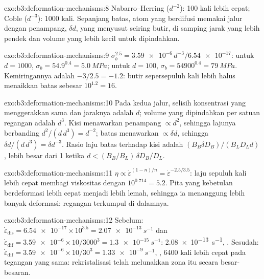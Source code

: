 \begin{solution}{exo:b3:deformation-mechanisms:8}
Nabarro--Herring ($d^{-2}$): 100 kali lebih cepat; Coble ($d^{-3}$): 1000 kali.
Sepanjang batas, atom yang berdifusi memakai jalur dengan penampang, $\delta
d$, yang menyusut seiring butir, di samping jarak yang lebih pendek dan volume
yang lebih kecil untuk dipindahkan.
\end{solution}

\begin{solution}{exo:b3:deformation-mechanisms:9}
$\sigma_b^{2.5} = \num{3.59e-6}\,d^{-3}/\num{6.54e-17}$: untuk $d = 1000$,
$\sigma_b = 54.9^{0.4} = \qty{5.0}{MPa}$; untuk $d = 100$, $\sigma_b =
\num{54900}^{0.4} = \qty{79}{MPa}$. Kemiringannya adalah $-3/2.5 = -1.2$: butir
sepersepuluh kali lebih halus menaikkan batas sebesar $10^{1.2} = 16$.
\end{solution}

\begin{solution}{exo:b3:deformation-mechanisms:10}
Pada kedua jalur, selisih konsentrasi yang menggerakkan sama dan jaraknya
adalah $d$; volume yang dipindahkan per satuan regangan adalah $d^3$. Kisi
menawarkan penampang $\propto d^2$, sehingga lajunya berbanding $d^2/(d\,d^3) =
d^{-2}$; batas menawarkan $\propto\delta d$, sehingga $\delta d/(d\,d^3) = \delta
d^{-3}$. Rasio laju batas terhadap kisi adalah $(B_B\delta D_B)/(B_LD_Ld)$,
lebih besar dari 1 ketika $d < (B_B/B_L)\,\delta D_B/D_L$.
\end{solution}

\begin{solution}{exo:b3:deformation-mechanisms:11}
$\eta \propto \dot\varepsilon^{(1-n)/n} = \dot\varepsilon^{-2.5/3.5}$: laju
sepuluh kali lebih cepat membagi viskositas dengan $10^{0.714} = 5.2$. Pita
yang kebetulan berdeformasi lebih cepat menjadi lebih lemah, sehingga ia
menanggung lebih banyak deformasi: regangan terkumpul di dalamnya.
\end{solution}

\begin{solution}{exo:b3:deformation-mechanisms:12}
Sebelum: $\dot\varepsilon_{\mathrm{dis}} = \num{6.54e-17}\times10^{3.5} =
\qty{2.07e-13}{s^{-1}}$ dan $\dot\varepsilon_{\mathrm{dif}} = \num{3.59e-6}
\times10/3000^3 = \qty{1.3e-15}{s^{-1}}$: \qty{2.08e-13}{s^{-1}}, . Sesudah: $\dot\varepsilon_{\mathrm{dif}} = \num{3.59e-6}\times10/30^3 =
\qty{1.33e-9}{s^{-1}}$, , \num{6400} kali lebih cepat pada
tegangan yang sama: rekristalisasi telah melunakkan zona itu secara besar-besaran.
\end{solution}

